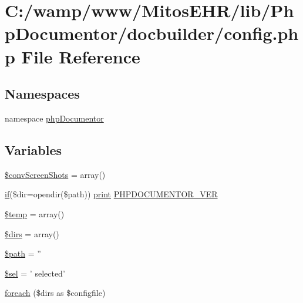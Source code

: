 \hypertarget{lib_2_php_documentor_2docbuilder_2config_8php}{\section{\-C\-:/wamp/www/\-Mitos\-E\-H\-R/lib/\-Php\-Documentor/docbuilder/config.php \-File \-Reference}
\label{lib_2_php_documentor_2docbuilder_2config_8php}
}
\subsection*{\-Namespaces}
\begin{DoxyCompactItemize}
\item 
namespace \hyperlink{namespacephp_documentor}{php\-Documentor}
\end{DoxyCompactItemize}
\subsection*{\-Variables}
\begin{DoxyCompactItemize}
\item 
\hyperlink{lib_2_php_documentor_2docbuilder_2config_8php_a1ae074fbd26c59147fdee4723b4ad36f}{\$conv\-Screen\-Shots} = array()
\item 
\hyperlink{_setup_8inc_8php_ad0184337b31d13763ec8751feff4aabe}{if}(\$dir=opendir(\$path)) \hyperlink{tokenizer__test_8php_a3ad3a4240c0f97c7e85aff5c52a454d4}{print} \hyperlink{lib_2_php_documentor_2docbuilder_2config_8php_acc42aabe5eaca03a65ddbe8a1f031857}{\-P\-H\-P\-D\-O\-C\-U\-M\-E\-N\-T\-O\-R\-\_\-\-V\-E\-R}
\item 
\hyperlink{lib_2_php_documentor_2docbuilder_2config_8php_a0d57fb0317e19ec798aa625381ebf342}{\$temp} = array()
\item 
\hyperlink{lib_2_php_documentor_2docbuilder_2config_8php_a1b709c1d79631ebc8320b41bda028b54}{\$dirs} = array()
\item 
\hyperlink{lib_2_php_documentor_2docbuilder_2config_8php_a0a4baf0b22973c07685c3981f0d17fc4}{\$path} = ''
\item 
\hyperlink{lib_2_php_documentor_2docbuilder_2config_8php_a01046c1157117c9c11071ecc2f32dfef}{\$sel} = ' selected'
\item 
\hyperlink{lib_2_php_documentor_2docbuilder_2config_8php_a664e3b3b67637d65a466eee1639ffa90}{foreach} (\$dirs as \$configfile)
\end{DoxyCompactItemize}


